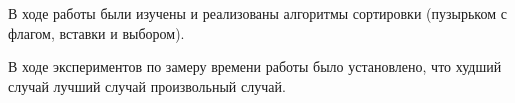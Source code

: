 \Conclusion
    В ходе работы были изучены и реализованы алгоритмы сортировки
    (пузырьком с флагом, вставки и выбором).
    
    В ходе экспериментов по замеру времени работы было установлено, что 
    худший случай
    лучший случай
    произвольный случай.
